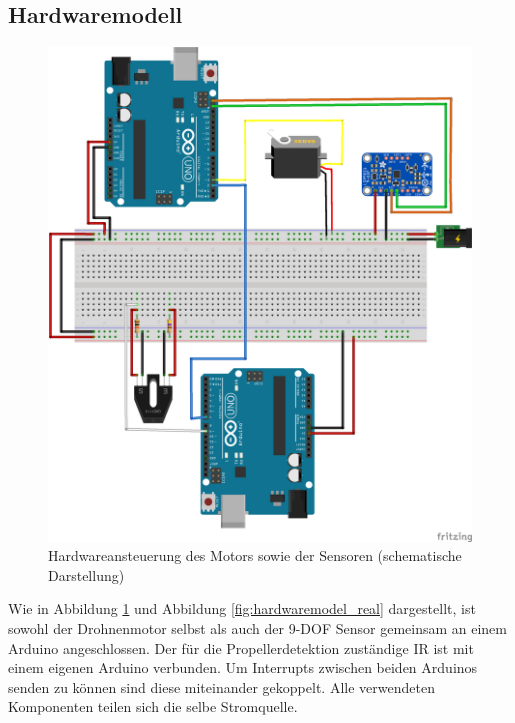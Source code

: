 \subsection{Hardwaremodell}
\label{subsec:hardwaremodell}

\begin{figure}[H]
	\centering
	\includegraphics[width=.9\textwidth]{images/chapter/03/hardware-layout.png}
	\caption{Hardwareansteuerung des Motors sowie der Sensoren (schematische Darstellung)}
	\label{fig:hardwaremodel_schema}
\end{figure}
Wie in Abbildung \ref{fig:hardwaremodel_schema} und Abbildung \ref{fig:hardwaremodel_real} dargestellt, ist sowohl der Drohnenmotor selbst als auch der \ac{9-DOF} Sensor gemeinsam an einem Arduino angeschlossen.
Der für die Propellerdetektion zuständige \ac{IR} ist mit einem eigenen Arduino verbunden.
Um Interrupts zwischen beiden Arduinos senden zu können sind diese miteinander gekoppelt.
Alle verwendeten Komponenten teilen sich die selbe Stromquelle.

